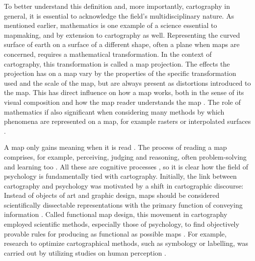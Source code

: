 To better understand this definition and,
more importantly, cartography in general,
it is essential to acknowledge the field's multidisciplinary nature.
As mentioned earlier,
mathematics is one example of a science essential to mapmaking,
and by extension to cartography as well.
Representing the curved surface of earth  %
on a surface of a different shape, often a plane when maps are concerned,
requires a mathematical transformation.
In the context of cartography, this transformation is called a map projection.  %
The effects the projection has on a map vary by
the properties of the specific transformation used and the scale of the map,
but are always present as distortions introduced to the map.
This has direct influence on how a map works, both in the sense of
its visual composition and
how the map reader understands the map \parencite{ker2018}.
The role of mathematics if also significant
when considering many methods by which phenomena are represented on a map,
for example rasters or interpolated surfaces \parencite{fra2000}.


A map only gains meaning when it is read \parencite{gri2017}.
The process of reading a map comprises, for example,
perceiving, judging and reasoning,
often problem-solving and learning too \parencite{mon2002}.
All these are cognitive processes \parencite{apacog},
so it is clear how the field of psychology is fundamentally tied with cartography.
Initially, the link between cartography and psychology
was motivated by a shift in cartographic discourse:
Instead of objects of art and graphic design,
maps should be considered scientifically dissectable representations
with the primary function of conveying information \parencite{rob1952}.
Called functional map design,
this movement in cartography employed scientific methods,
especially those of psychology,
to find objectively provable rules
for producing as functional as possible maps \parencite{mon2002}.
For example,
research to optimize cartographical methods, such as symbology or labelling,
was carried out by utilizing studies on human perception \parencite{mac2004}.

